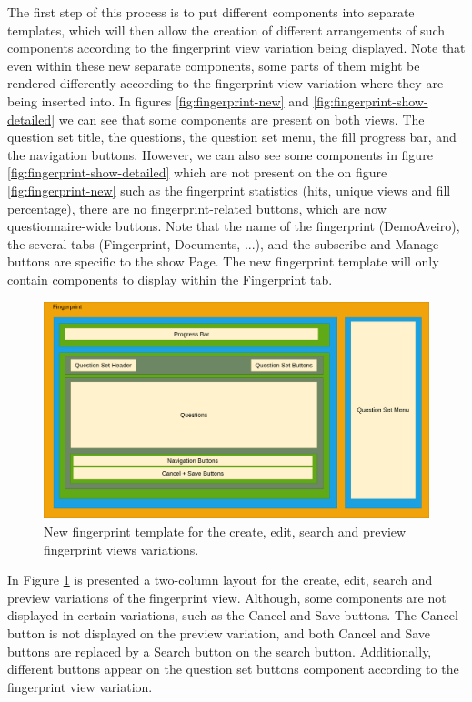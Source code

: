 The first step of this process is to put different components into separate templates, which will then allow the creation of different arrangements of such components according to the fingerprint view variation being displayed.
Note that even within these new separate components, some parts of them might be rendered differently according to the fingerprint view variation where they are being inserted into.
In figures \ref{fig:fingerprint-new} and \ref{fig:fingerprint-show-detailed} we can see that some components are present on both views.
The question set title, the questions, the question set menu, the fill progress bar, and the navigation buttons.
However, we can also see some components in figure \ref{fig:fingerprint-show-detailed} which are not present on the on figure \ref{fig:fingerprint-new} such as the fingerprint statistics (hits, unique views and fill percentage), there are no fingerprint-related buttons, which are now questionnaire-wide buttons.
Note that the name of the fingerprint (DemoAveiro), the several tabs (Fingerprint, Documents, ...), and the subscribe and Manage buttons are specific to the show Page.
The new fingerprint template will only contain components to display within the Fingerprint tab.

\begin{figure}
    \center
    \includegraphics[width=\textwidth]{fingerprint-other-after-diagram}
    \caption{New fingerprint template for the create, edit, search and preview fingerprint views variations.}
    \label{fig:fingerprint-other-after-diagram}
\end{figure}

In Figure \ref{fig:fingerprint-other-after-diagram} is presented a two-column layout for the create, edit, search and preview variations of the fingerprint view.
Although, some components are not displayed in certain variations, such as the Cancel and Save buttons.
The Cancel button is not displayed on the preview variation, and both Cancel and Save buttons are replaced by a Search button on the search button.
Additionally, different buttons appear on the question set buttons component according to the fingerprint view variation.

